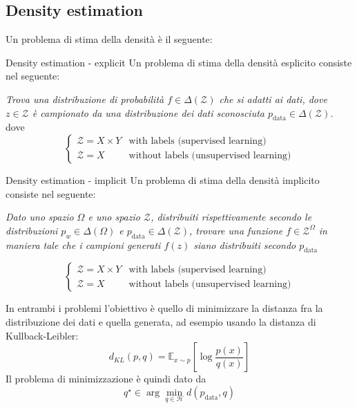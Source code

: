 \subsection{Density estimation}
Un problema di stima della densità è il seguente:
\begin{definizione}{Density estimation - explicit}
	Un problema di stima della densità esplicito consiste nel seguente:
	\begin{center}
		\textit{
			Trova una distribuzione di probabilità $f \in \Delta(\mathcal{Z})$ che si adatti ai dati, dove $z \in \mathcal{Z}$ è campionato da una distribuzione dei dati sconosciuta $p_{\text{data}} \in \Delta(\mathcal{Z})$.
		}
		dove
		\[
			\begin{cases}
				\mathcal{Z} = X \times Y & \text{with labels (supervised learning)}      \\
				\mathcal{Z} = X          & \text{without labels (unsupervised learning)}
			\end{cases}
		\]
	\end{center}

\end{definizione}
\begin{definizione}{Density estimation - implicit}
	Un problema di stima della densità implicito consiste nel seguente:
	\begin{center}
		\textit{
			Dato uno spazio $ \Omega $ e uno spazio $ \mathcal{Z} $, distribuiti rispettivamente secondo le distribuzioni $ p_{w} \in \Delta\left( \Omega \right) $ e $ p_{\operatorname{data}} \in \Delta \left(\mathcal{Z}\right) $, trovare una funzione $ f \in \mathcal{Z}^{\Omega} $ in maniera tale che i campioni generati $ f\left(z\right) $ siano distribuiti secondo $ p_{\operatorname{data}} $
		}
	\end{center}
	\[
		\begin{cases}
			\mathcal{Z} = X \times Y & \text{with labels (supervised learning)}      \\
			\mathcal{Z} = X          & \text{without labels (unsupervised learning)}
		\end{cases}
	\]
\end{definizione}
In entrambi i problemi l'obiettivo è quello di minimizzare la distanza fra la distribuzione dei dati e quella generata, ad esempio usando la distanza di Kullback-Leibler:
\[
	d_{KL}\left(p, q\right) = \mathbb{E}_{x \sim p}\left[\log \frac{p\left(x\right)}{q\left(x\right)}\right]
\]
Il problema di minimizzazione è quindi dato da
\[
	q^\star \in \arg\min_{q \in \mathcal{H}} d(p_{\text{data}}, q)
\]


